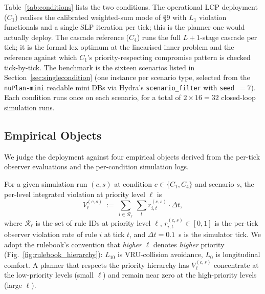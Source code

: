 Table~\ref{tab:conditions} lists the two conditions. The operational LCP deployment ($C_1$) realises the calibrated weighted-sum mode of \cite{lcp2025} \S9 with $L_1$ violation functionals and a single SLP iteration per tick; this is the planner one would actually deploy. The cascade reference ($C_4$) runs the full $L{+}1$-stage cascade per tick; it is the formal lex optimum at the linearised inner problem and the reference against which $C_1$'s priority-respecting compromise pattern is checked tick-by-tick. The benchmark is the sixteen scenarios listed in Section~\ref{sec:singlecondition} (one instance per scenario type, selected from the \texttt{nuPlan-mini} readable mini DBs via Hydra's \texttt{scenario\_filter} with \texttt{seed}~$= 7$). Each condition runs once on each scenario, for a total of $2 \times 16 = 32$ closed-loop simulation runs.

\subsection{Empirical Objects}
\label{sec:protocol:objects}

We judge the deployment against four empirical objects derived from the per-tick observer evaluations and the per-condition simulation logs.

\begin{definition}
\label{def:per-level-violation}
For a given simulation run $(c, s)$ at condition $c \in \{C_1, C_4\}$ and scenario $s$, the per-level integrated violation at priority level $\ell$ is
\begin{equation}
    V_{\ell}^{(c, s)}\ :=\ \sum_{i \in \mathcal{R}_{\ell}}\ \sum_{t} r_{i, t}^{(c, s)} \cdot \Delta t,
    \label{eq:V-level}
\end{equation}
where $\mathcal{R}_{\ell}$ is the set of rule IDs at priority level $\ell$, $r_{i, t}^{(c, s)} \in [0, 1]$ is the per-tick observer violation rate of rule $i$ at tick $t$, and $\Delta t = 0.1$~s is the simulator tick. We adopt the rulebook's convention that \emph{higher} $\ell$ denotes \emph{higher} priority (Fig.~\ref{fig:rulebook_hierarchy}): $L_{10}$ is VRU-collision avoidance, $L_0$ is longitudinal comfort. A planner that respects the priority hierarchy has $V_{\ell}^{(c, s)}$ concentrate at the low-priority levels (small $\ell$) and remain near zero at the high-priority levels (large $\ell$).
\end{definition}

